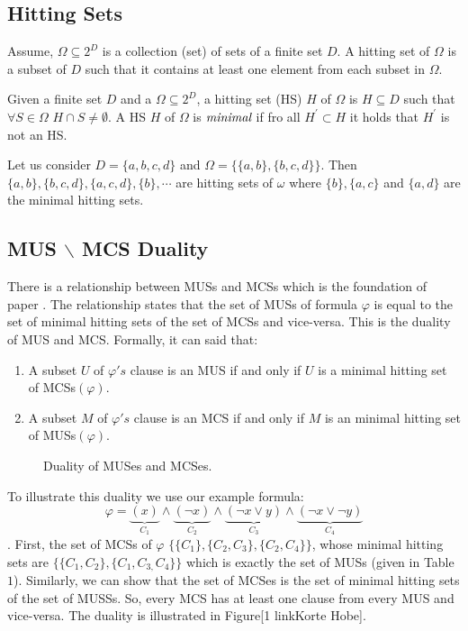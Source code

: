 \subsection{Hitting Sets}
Assume, $\Omega \subseteq 2^{D}$ is a collection (set) of sets of a finite set $D$. A hitting set of $\Omega$ is a subset of $D$ such that it contains at least one element from each subset in $\Omega$.
\begin{definition}
Given a finite set $D$ and a $\Omega \subseteq 2^{D}$, a hitting set (HS) $H$ of $\Omega$ is $H\subseteq D$ such that $\forall S\in \Omega$ $H\cap S\neq \emptyset$. A HS $H$ of $\Omega$ is $\emph{minimal}$ if fro all $H^{\prime}\subset H$ it holds that $H^{\prime}$ is not an HS.
\end{definition}
\begin{example}
Let us consider $D=\{a, b,c,d\}$ and $\Omega=\{\{a, b\}, \{b, c, d\}\}$. Then $\{a,b\}, \{b,c,d\}, \{a,c,d\}, \{b\},\cdots$ are hitting sets of $\omega$ where $\{b\}, \{a,c\} $ and $ \{a,d\}$ are the minimal hitting sets.	
\end{example}
\subsection{MUS $\backslash$ MCS Duality}
There is a relationship between MUSs and MCSs which is the foundation of paper \cite{karem}. The relationship states that the set of MUSs of formula $\varphi$ is equal to the set of minimal hitting sets of the set of MCSs and vice-versa. This is the duality of MUS and MCS. Formally, it can said that:
\begin{enumerate}
	\item A subset $U$ of $\varphi 's$ clause is an MUS if and only if $U$ is a minimal hitting set of MCSs$(\varphi)$.
	\item A subset $M$ of $\varphi 's$ clause is an MCS if and only if $M$ is an minimal hitting set of MUSs$(\varphi)$.
\end{enumerate}
\begin{figure}[htb] %
	\begin{center}
		
	\end{center}
	\caption{Duality of MUSes and MCSes.}
	\label{fig:graph}
\end{figure}

\begin{example}
		To illustrate this duality we use our example formula: $$\varphi=\underbrace{(x)}\limits_{C_{1}}\wedge\underbrace{(\neg x)}\limits_{C_{2}}\wedge\underbrace{(\neg x\vee y)}\limits_{C_{3}}\wedge\underbrace{(\neg x \vee \neg y)}\limits_{C_{4}}$$. First, the set of MCSs of $\varphi$  $\{\{C_{1}\}, \{C_{2}, C_{3}\}, \{C_{2}, C_{4}\}\}$, whose minimal hitting sets are $\{\{C_{1}, C_{2}\}, \{C_{1}, C_{3,} C_{4}\}\}$ which is exactly the set of MUSs (given in Table $1$). Similarly, we can show that the set of MCSes is the set of minimal hitting sets of the set of MUSSs. So, every MCS has at least one clause from every MUS and vice-versa. The duality is illustrated in Figure[1 linkKorte Hobe].
	
\end{example}
